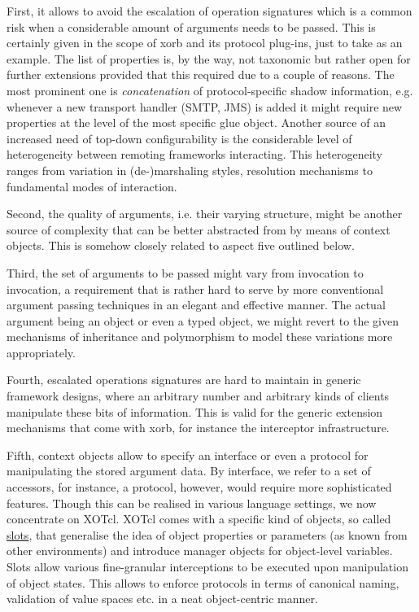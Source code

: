 First, it allows to avoid the escalation of operation signatures which is a common risk when a considerable amount of arguments needs to be passed. This is certainly given in the scope of xorb and its protocol plug-ins, just to take  as an example. The list of properties is, by the way, not taxonomic but rather open for further extensions provided that this required due to a couple of reasons. The most prominent one is \emph{concatenation} of protocol-specific shadow information, e.g. whenever a new transport handler (SMTP, JMS) is added it might require new properties at the level of the most specific glue object. Another source of an increased need of top-down configurability is the considerable level of heterogeneity between remoting frameworks interacting. This heterogeneity ranges from variation in (de-)marshaling styles, resolution mechanisms to fundamental modes of interaction.

Second, the quality of arguments, i.e. their varying structure, might be another source of complexity that can be better abstracted from by means of context objects. This is somehow closely related to aspect five outlined below.

Third, the set of arguments to be passed might vary from invocation to invocation, a requirement that is rather hard to serve by more conventional argument passing techniques in an elegant and effective manner. The actual argument being an object or even a typed object, we might revert to the given mechanisms of inheritance and polymorphism to model these variations more appropriately.

Fourth, escalated operations signatures are hard to maintain in generic framework designs, where an arbitrary number and arbitrary kinds of clients manipulate these bits of information. This is valid for the generic extension mechanisms that come with xorb, for instance the interceptor infrastructure.

Fifth, context objects allow to specify an interface or even a protocol for manipulating the stored argument data. By interface, we refer to a set of accessors, for instance, a protocol, however, would require more sophisticated features. Though this can be realised in various language settings, we now concentrate on XOTcl. XOTcl comes with a specific kind of objects, so called \href{http://media.wu-wien.ac.at/doc/tutorial.html#slots}{slots}, that generalise the idea of object properties or parameters (as known from other environments) and introduce manager objects for object-level variables. Slots allow various fine-granular interceptions to be executed upon manipulation of object states. This allows to enforce protocols in terms of canonical naming, validation of value spaces etc. in a neat object-centric manner.

